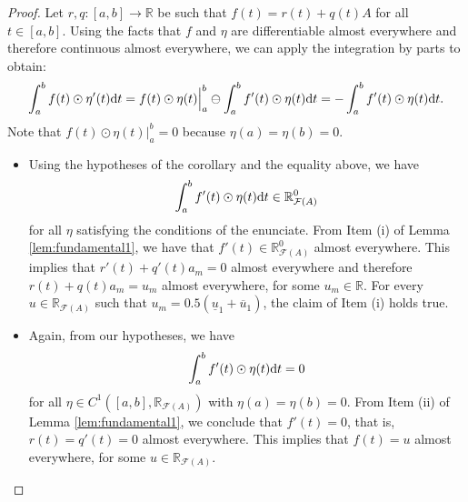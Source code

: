 \documentclass[12pt,a4paper]{article}
\newcommand{\RR}{\mathbb{R}}
\newcommand{\RFA}{\mathbb{R}_{\mathcal{F}(A)}}
\begin{document}
\begin{proof}
Let $r,q:[a,b]\to \RR$ be such that $f(t) = r(t) + q(t)A$ for all $t \in [a,b]$.
 Using the facts that $f$ and $\eta$ are differentiable almost everywhere and therefore continuous almost everywhere, we can apply the integration by parts to obtain:
 $$
 \int_{a}^{b} f(t)\odot\eta'(t)\textnormal{d}t = f(t)\odot\eta(t) \Big|_a^b \ominus \int_{a}^{b} f'(t)\odot\eta(t)\textnormal{d}t = - \int_{a}^{b} f'(t)\odot\eta(t)\textnormal{d}t.
 $$
Note that $f(t)\odot\eta(t) \Big|_a^b = 0$ because $\eta(a) = \eta(b) = 0.$
\begin{itemize}
\item[(i)] Using the hypotheses of the corollary and the equality above, we have 
 $$
 \int_{a}^{b} f'(t)\odot\eta(t)\textnormal{d}t \in \RFA^0
 $$
for all $\eta$ satisfying the conditions of the enunciate. From Item (i) of Lemma \ref{lem:fundamental1}, 
we have that $f'(t) \in \RFA^0$ almost everywhere. This implies that 
$r'(t) + q'(t)a_m = 0$ almost everywhere and therefore 
$r(t) + q(t)a_m = u_m$ almost everywhere, for some $u_m \in \RR$. 
For every $u \in \RFA$ such that $u_m = 0.5(\underline{u}_1 + \overline{u}_1)$, the claim of Item (i) holds true. 

\item[(ii)] Again, from our hypotheses, we have 
$$
 \int_{a}^{b} f'(t)\odot\eta(t)\textnormal{d}t = 0
 $$
for all $\eta \in C^1([a,b],\RFA)$ with $\eta(a)= \eta(b) = 0$. 
From Item (ii) of Lemma \ref{lem:fundamental1}, we conclude that $f'(t)  = 0$, that is, $r(t) =  q'(t)=0$ almost everywhere.
This implies that $f(t) = u$ almost everywhere, for some $u \in \RFA$. 
\end{itemize}
\end{proof}
\end{document}

